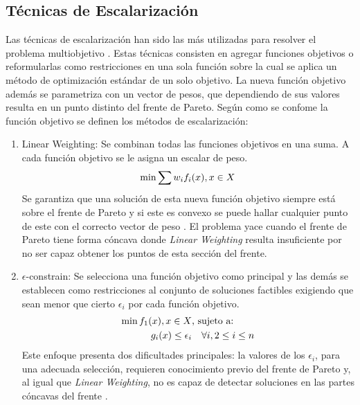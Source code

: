 \subsection{T\'ecnicas de Escalarizaci\'on }

Las t\'ecnicas de escalarizaci\'on han sido las m\'as utilizadas para resolver el problema multiobjetivo . Estas t\'ecnicas consisten en agregar funciones objetivos o  reformularlas como restricciones en una sola funci\'on sobre la cual se aplica un m\'etodo de optimizaci\'on est\'andar de un solo objetivo. La nueva funci\'on objetivo adem\'as se parametriza con un vector de pesos, que dependiendo de sus valores resulta en un punto distinto del frente de Pareto. Seg\'un como se confome la funci\'on objetivo se definen los m\'etodos de escalarizaci\'on:
\begin{enumerate}
    \item Linear Weighting: Se combinan todas las funciones objetivos en una suma. A cada funci\'on objetivo se le asigna un escalar de peso.
    \begin{equation*}
        \min \sum w_i f_i(x), \space x \in X
    \end{equation*}
    Se garantiza que una soluci\'on de esta nueva funci\'on objetivo siempre est\'a sobre el frente de Pareto  y si este es convexo se puede hallar cualquier punto de este con el correcto vector de peso . El problema yace cuando el frente de Pareto tiene forma c\'oncava donde \textit{Linear Weighting} resulta insuficiente por no ser capaz obtener los puntos de esta secci\'on del frente.

    \item $\epsilon$-constrain: Se selecciona una funci\'on objetivo como principal y las dem\'as se establecen como restricciones al conjunto de soluciones factibles exigiendo que sean menor que cierto $\epsilon_i$  por cada funci\'on objetivo.
    \begin{align*}
            \min  f_1(x), \space x \in X  & \text{, sujeto a:}   \\
            g_i(x) \leq \epsilon_i & \quad  \forall i, 2 \leq i \leq n
    \end{align*}
    Este enfoque presenta dos dificultades principales: la valores de los $\epsilon_i$, para una adecuada selecci\'on, requieren conocimiento previo del frente de Pareto y, al igual que \textit{Linear Weighting}, no es capaz de detectar soluciones en las partes c\'oncavas del frente .


\end{enumerate}
